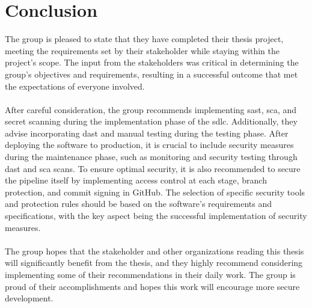 \section{Conclusion}
The group is pleased to state that they have completed their thesis project, meeting the requirements set by their stakeholder while staying within the project's scope. The input from the stakeholders was critical in determining the group's objectives and requirements, resulting in a successful outcome that met the expectations of everyone involved.
\\~\\
After careful consideration, the group recommends implementing \acrshort{sast}, \acrshort{sca}, and secret scanning during the implementation phase of the \acrlong{sdlc}. Additionally, they advise incorporating \acrshort{dast} and manual testing during the testing phase. After deploying the software to production, it is crucial to include security measures during the maintenance phase, such as monitoring and security testing through \acrshort{dast} and \acrshort{sca} scans. To ensure optimal security, it is also recommended to secure the \gls{pipeline} itself by implementing access control at each stage, branch protection, and commit signing in GitHub. The selection of specific security tools and protection rules should be based on the software's requirements and specifications, with the key aspect being the successful implementation of security measures.
\\~\\
The group hopes that the stakeholder and other organizations reading this thesis will significantly benefit from the thesis, and they highly recommend considering implementing some of their recommendations in their daily work. The group is proud of their accomplishments and hopes this work will encourage more secure development.